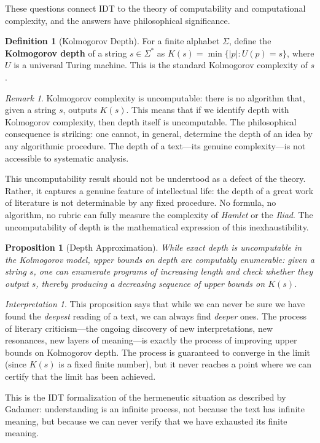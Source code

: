 \documentclass[11pt,openany]{book}
\theoremstyle{definition}
\newtheorem{definition}[axiom]{Definition}
\theoremstyle{plain}
\newtheorem{proposition}[axiom]{Proposition}
\theoremstyle{remark}
\newtheorem{remark}[axiom]{Remark}
\newtheorem{interpretation}[axiom]{Interpretation}
\begin{document}
These questions connect IDT to the theory of computability and computational complexity, and the answers have philosophical significance.

\begin{definition}[Kolmogorov Depth]
For a finite alphabet $\Sigma$, define the \textbf{Kolmogorov depth} of a string $s \in \Sigma^*$ as $K(s) = \min\{|p| : U(p) = s\}$, where $U$ is a universal Turing machine. This is the standard Kolmogorov complexity of $s$.
\end{definition}

\begin{remark}
Kolmogorov complexity is uncomputable: there is no algorithm that, given a string $s$, outputs $K(s)$. This means that if we identify depth with Kolmogorov complexity, then depth itself is uncomputable. The philosophical consequence is striking: one cannot, in general, determine the depth of an idea by any algorithmic procedure. The depth of a text---its genuine complexity---is not accessible to systematic analysis.
\end{remark}

This uncomputability result should not be understood as a defect of the theory. Rather, it captures a genuine feature of intellectual life: the depth of a great work of literature is not determinable by any fixed procedure. No formula, no algorithm, no rubric can fully measure the complexity of \emph{Hamlet} or the \emph{Iliad}. The uncomputability of depth is the mathematical expression of this inexhaustibility.

\begin{proposition}[Depth Approximation]
While exact depth is uncomputable in the Kolmogorov model, upper bounds on depth are computably enumerable: given a string $s$, one can enumerate programs of increasing length and check whether they output $s$, thereby producing a decreasing sequence of upper bounds on $K(s)$.
\end{proposition}

\begin{interpretation}
This proposition says that while we can never be sure we have found the \emph{deepest} reading of a text, we can always find \emph{deeper} ones. The process of literary criticism---the ongoing discovery of new interpretations, new resonances, new layers of meaning---is exactly the process of improving upper bounds on Kolmogorov depth. The process is guaranteed to converge in the limit (since $K(s)$ is a fixed finite number), but it never reaches a point where we can certify that the limit has been achieved.

This is the IDT formalization of the hermeneutic situation as described by Gadamer: understanding is an infinite process, not because the text has infinite meaning, but because we can never verify that we have exhausted its finite meaning.
\end{interpretation}
\end{document}
